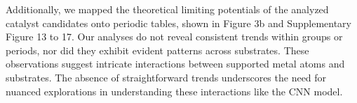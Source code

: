 Additionally, we mapped the theoretical limiting potentials of the analyzed catalyst candidates onto periodic tables, shown in Figure 3b and Supplementary Figure 13 to 17.
Our analyses do not reveal consistent trends within groups or periods, nor did they exhibit evident patterns across substrates.
These observations suggest intricate interactions between supported metal atoms and substrates.
The absence of straightforward trends underscores the need for nuanced explorations in understanding these interactions like the CNN model.
